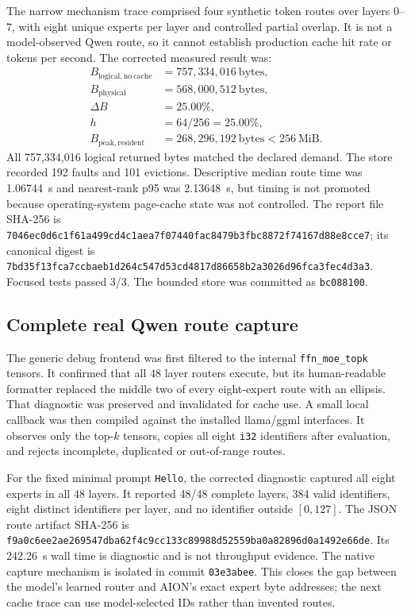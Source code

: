 The narrow mechanism trace comprised four synthetic token routes over layers
0--7, with eight unique experts per layer and controlled partial overlap.  It is
not a model-observed Qwen route, so it cannot establish production cache hit rate
or tokens per second.  The corrected measured result was:
\begin{align*}
 B_{\mathrm{logical,no\ cache}} &= 757{,}334{,}016\ \mathrm{bytes},\\
 B_{\mathrm{physical}} &= 568{,}000{,}512\ \mathrm{bytes},\\
 \Delta B &= 25.00\%,\\
 h &= 64/256 = 25.00\%,\\
 B_{\mathrm{peak,resident}} &= 268{,}296{,}192\ \mathrm{bytes}
 < 256\ \mathrm{MiB}.
\end{align*}
All 757{,}334{,}016 logical returned bytes matched the declared demand.  The store
recorded 192 faults and 101 evictions.  Descriptive median route time was
1.06744~s and nearest-rank p95 was 2.13648~s, but timing is not promoted because
operating-system page-cache state was not controlled.  The report file SHA-256 is
\texttt{7046ec0d6c1f61a499cd4c1aea7f07440fac8479b3fbc8872f74167d88e8cce7};
its canonical digest is
\texttt{7bd35f13fca7ccbaeb1d264c547d53cd4817d86658b2a3026d96fca3fec4d3a3}.
Focused tests passed 3/3.  The bounded store was committed as
\texttt{bc088100}.

\subsection{Complete real Qwen route capture}

The generic debug frontend was first filtered to the internal
\texttt{ffn\_moe\_topk} tensors.  It confirmed that all 48 layer routers execute,
but its human-readable formatter replaced the middle two of every eight-expert
route with an ellipsis.  That diagnostic was preserved and invalidated for cache
use.  A small local callback was then compiled against the installed llama/ggml
interfaces.  It observes only the top-$k$ tensors, copies all eight \texttt{i32}
identifiers after evaluation, and rejects incomplete, duplicated or out-of-range
routes.

For the fixed minimal prompt \texttt{Hello}, the corrected diagnostic captured
all eight experts in all 48 layers.  It reported 48/48 complete layers, 384 valid
identifiers, eight distinct identifiers per layer, and no identifier outside
$[0,127]$.  The JSON route artifact SHA-256 is
\texttt{f9a0c6ee2ae269547dba62f4c9cc133c89988d52559ba0a82896d0a1492e66de}.
Its 242.26~s wall time is diagnostic and is not throughput evidence.  The native
capture mechanism is isolated in commit \texttt{03e3abee}.  This closes the gap
between the model's learned router and AION's exact expert byte addresses; the
next cache trace can use model-selected IDs rather than invented routes.

